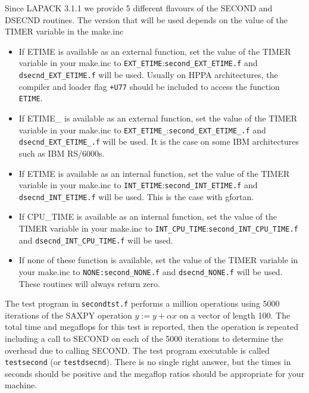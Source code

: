 \documentclass[11pt]{report}
\begin{document}
Since LAPACK 3.1.1 we provide 5 different flavours of the SECOND and DSECND routines.
The version that will be used depends on the value of the TIMER variable in the make.inc

\begin{itemize}
\item If ETIME is available as an external function, set the value of the TIMER variable in your 
make.inc to \texttt{EXT\_ETIME}:\texttt{second\_EXT\_ETIME.f} and \texttt{dsecnd\_EXT\_ETIME.f} will be used.
Usually on HPPA architectures,
the compiler and loader flag \texttt{+U77} should be included to access
the function \texttt{ETIME}.

\item If ETIME\_ is available as an external function, set the value of the TIMER variable in your make.inc 
to \texttt{EXT\_ETIME\_}:\texttt{second\_EXT\_ETIME\_.f} and \texttt{dsecnd\_EXT\_ETIME\_.f} will be used.
It is the case on some IBM architectures such as IBM RS/6000s.

\item If ETIME is available as an internal function, set the value of the TIMER variable in your make.inc
to \texttt{INT\_ETIME}:\texttt{second\_INT\_ETIME.f}  and \texttt{dsecnd\_INT\_ETIME.f} will be used. 
This is the case with gfortan.

\item If CPU\_TIME is available as an internal function, set the value of the TIMER variable in your make.inc
to \texttt{INT\_CPU\_TIME}:\texttt{second\_INT\_CPU\_TIME.f} and \texttt{dsecnd\_INT\_CPU\_TIME.f} will be used.

\item If none of these function is available, set the value of the TIMER variable in your make.inc
to \texttt{NONE:}\texttt{second\_NONE.f} and \texttt{dsecnd\_NONE.f} will be used.
These routines will always return zero.
\end{itemize}

The test program in \texttt{secondtst.f}
performs a million operations using 5000 iterations of 
the SAXPY operation $y := y + \alpha x$ on a vector of length 100.
The total time and megaflops for this test is reported, then
the operation is repeated including a call to SECOND on each of
the 5000 iterations to determine the overhead due to calling SECOND.
The test program executable is called \texttt{testsecond} (or \texttt{testdsecnd}).
There is no single right answer, but the times
in seconds should be positive and the megaflop ratios should be 
appropriate for your machine.
\end{document}
